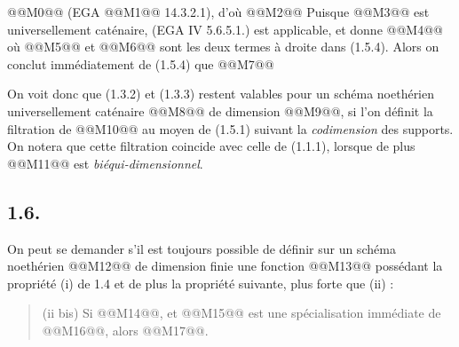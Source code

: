 
@@M0@@
(EGA @@M1@@ 14.3.2.1), d'où
@@M2@@
Puisque @@M3@@ est universellement caténaire, (EGA IV 5.6.5.1.) est applicable, et donne
@@M4@@
où @@M5@@ et @@M6@@ sont les deux termes à droite dans (1.5.4). Alors on conclut immédiatement de (1.5.4) que
@@M7@@

On voit donc que (1.3.2) et (1.3.3) restent valables pour un schéma noethérien universellement caténaire @@M8@@ de dimension @@M9@@, si l'on définit la filtration de @@M10@@ au moyen de (1.5.1) suivant la \emph{codimension} des supports. On notera que cette filtration coincide avec celle de (1.1.1), lorsque de plus @@M11@@ est \emph{biéqui-dimensionnel}.

\subsection*{1.6.}
On peut se demander s'il est toujours possible de définir sur un schéma noethérien @@M12@@ de dimension finie une fonction @@M13@@ possédant la propriété (i) de 1.4 et de plus la propriété suivante, plus forte que (ii) :
\begin{quote}
(ii bis) Si @@M14@@, et @@M15@@ est une spécialisation immédiate de @@M16@@, alors @@M17@@.
\end{quote}

